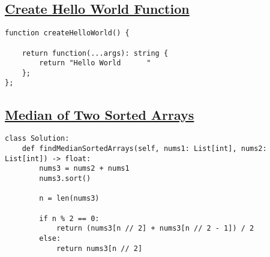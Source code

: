 \documentclass{article}
\begin{document}
\subsection{\href{https://leetcode.com/problems/create-hello-world-function/?envType=company&envId=amazon&favoriteSlug=amazon-thirty-days}{Create Hello World Function}}

\begin{lstlisting}
function createHelloWorld() {
    
    return function(...args): string {
        return "Hello World      "
    };
};
\end{lstlisting}

\subsection{\href{https://leetcode.com/problems/median-of-two-sorted-arrays/?envType=company&envId=amazon&favoriteSlug=amazon-thirty-days}{Median of Two Sorted Arrays}}

\begin{lstlisting}
class Solution:
    def findMedianSortedArrays(self, nums1: List[int], nums2: List[int]) -> float:
        nums3 = nums2 + nums1
        nums3.sort()

        n = len(nums3)

        if n % 2 == 0:
            return (nums3[n // 2] + nums3[n // 2 - 1]) / 2
        else:
            return nums3[n // 2]
\end{lstlisting}
\end{document}
